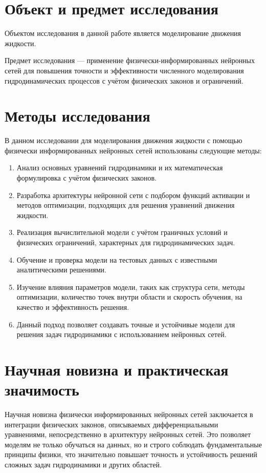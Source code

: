 \section{Объект и предмет исследования}
Объектом исследования в данной работе является моделирование движения жидкости.

Предмет исследования — применение физически-информированных нейронных сетей
для повышения точности и эффективности численного моделирования гидродинамических
процессов с учётом физических законов и ограничений.
\section{Методы исследования}
В данном исследовании для моделирования движения жидкости с помощью физически
информированных нейронных сетей использованы следующие методы:
\begin{enumerate}
    \item Анализ основных уравнений гидродинамики и их математическая формулировка
    с учётом физических законов.
    \item Разработка архитектуры нейронной сети с подбором функций активации и
    методов оптимизации, подходящих для решения уравнений движения жидкости.
    \item Реализация вычислительной модели с учётом граничных условий и физических
    ограничений, характерных для гидродинамических задач.
    \item Обучение и проверка модели на тестовых данных с известными аналитическими
    решениями.
    \item Изучение влияния параметров модели, таких как структура сети, методы
    оптимизации, количество точек внутри области и скорость обучения, на качество
    и эффективность решения.
    \item Данный подход позволяет создавать точные и устойчивые модели для решения
    задач гидродинамики с использованием нейронных сетей.
\end{enumerate}

\section{Научная новизна и практическая значимость}
Научная новизна физически информированных нейронных сетей заключается в интеграции
физических законов, описываемых дифференциальными уравнениями, непосредственно в
архитектуру нейронных сетей. Это позволяет моделям не только обучаться на данных,
но и строго соблюдать фундаментальные принципы физики, что значительно повышает
точность и устойчивость решений сложных задач гидродинамики и других областей.

